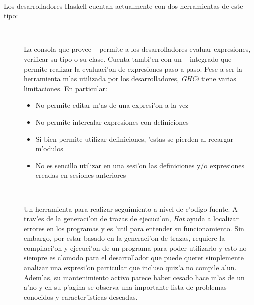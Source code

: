 \documentclass[a4paper]{article}
\begin{document}
\paragraph{}Los desarrolladores Haskell cuentan actualmente con dos herramientas de este tipo:
\begin{description}
	\item[~\cite{ghci}]
		La consola que provee ~\cite{ghc} permite a los desarrolladores evaluar expresiones, verificar su tipo o su clase.  Cuenta tambi'en con un ~\cite{ghcdebug} integrado que permite realizar la evaluaci'on de expresiones paso a paso.  Pese a ser la herramienta m'as utilizada por los desarrolladores, \textit{GHCi} tiene varias limitaciones.  En particular:
		\begin{itemize}
			\item No permite editar m'as de una expresi'on a la vez
			\item No permite intercalar expresiones con definiciones
			\item	Si bien permite utilizar definiciones, 'estas se pierden al recargar m'odulos
			\item No es sencillo utilizar en una sesi'on las definiciones y/o expresiones creadas en sesiones anteriores
		\end{itemize}
	\item[~\cite{hat}]
		Un herramienta para realizar seguimiento a nivel de c'odigo fuente.  A trav'es de la generaci'on de trazas de ejecuci'on, \textit{Hat} ayuda a localizar errores en los programas y es 'util para entender su funcionamiento.  Sin embargo, por estar basado en la generaci'on de trazas, requiere la compilaci'on y ejecuci'on de un programa para poder utilizarlo y esto no siempre es c'omodo para el desarrollador que puede querer simplemente analizar una expresi'on particular que incluso quiz'a no compile a'un.  Adem'as, su mantenimiento activo parece haber cesado hace m'as de un a'no y en su p'agina se observa una importante lista de problemas conocidos y caracter'isticas deseadas.
\end{description}

\end{document}
